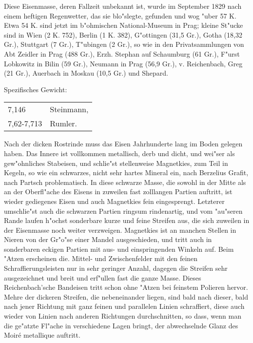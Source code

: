\documentclass[a4paper, 11pt, oneside]{article}
\begin{document}
Diese Eisenmasse, deren Fallzeit unbekannt ist, wurde im September 1829 nach einem heftigen Regenwetter, das sie blo"slegte, gefunden und wog "uber 57 K. Etwa 54 K. sind jetzt im b"ohmischen National-Museum in Prag; kleine St"ucke sind in Wien (2 K. 752), Berlin (1 K. 382), G"ottingen (31,5 Gr.), Gotha (18,32 Gr.), Stuttgart (7 Gr.), T"ubingen (2 Gr.), so wie in den Privatsammlungen von Abt Zeidler in Prag (488 Gr.), Erzh. Stephan auf Schaumburg (61 Gr.), F"urst Lobkowitz in Bilin (59 Gr.), Neumann in Prag (56,9 Gr.), v. Reichenbach, Greg (21 Gr.), Auerbach in Moskau (10,5 Gr.) und Shepard.

Spezifisches Gewicht:  
\begin{table}[!ht]
    \centering
    \begin{tabular}{l l}
        7,146 & Steinmann,\\
        7,62-7,713 & Rumler.
    \end{tabular}
\end{table}

Nach der dicken Rostrinde muss das Eisen Jahrhunderte lang im Boden gelegen haben. Das Innere ist vollkommen metallisch, derb und dicht, und wei"ser als gew"ohnliches Stabeisen, und schlie"st stellenweise Magnetkies, zum Teil in Kegeln, so wie ein schwarzes, nicht sehr hartes Mineral ein, nach Berzelius Grafit, nach Partsch problematisch. In diese schwarze Masse, die sowohl in der Mitte als an der Oberfl"ache des Eisens in zuweilen fast zolllangen Partien auftritt, ist wieder gediegenes Eisen und auch Magnetkies fein eingesprengt. Letzterer umschlie"st auch die schwarzen Partien ringsum rindenartig, und vom "au"seren Rande laufen h"ochst sonderbare kurze und feine Streifen aus, die sich zuweilen in der Eisenmasse noch weiter verzweigen. Magnetkies ist an manchen Stellen in Nieren von der Gr"o"se einer Mandel ausgeschieden, und tritt auch in sonderbaren eckigen Partien mit aus- und einspringenden Winkeln auf. Beim "Atzen erscheinen die. Mittel- und Zwischenfelder mit den feinen Schraffierungsleisten nur in sehr geringer Anzahl, dagegen die Streifen sehr ausgezeichnet und breit und erf"ullen fast die ganze Masse. Dieses Reichenbach'sche Bandeisen tritt schon ohne "Atzen bei feinstem Polieren hervor. Mehre der dickeren Streifen, die nebeneinander liegen, sind bald nach dieser, bald nach jener Richtung mit ganz feinen und parallelen Linien schraffiert, diese auch wieder von Linien nach anderen Richtungen durchschnitten, so dass, wenn man die ge"atzte Fl"ache in verschiedene Lagen bringt, der abwechselnde Glanz des Moiré metallique auftritt.
\end{document}
